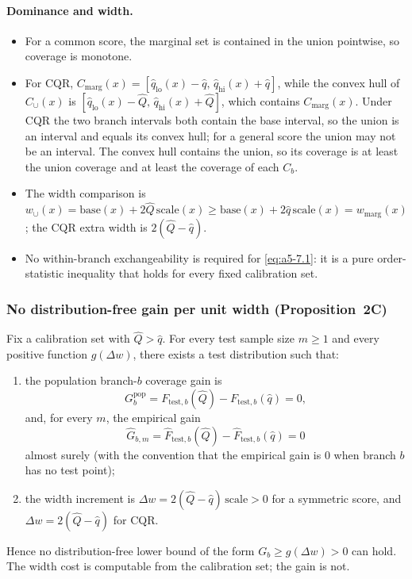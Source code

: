 \paragraph{Dominance and width.}
\begin{itemize}
\item For a common score, the marginal set is contained in the union
pointwise, so coverage is monotone.
\item For CQR,
$C_{\mathrm{marg}}(x)=[\hat q_{\mathrm{lo}}(x)-\hat q,\,
\hat q_{\mathrm{hi}}(x)+\hat q]$, while the convex hull of $C_\cup(x)$
is $[\hat q_{\mathrm{lo}}(x)-\hat Q,\,
\hat q_{\mathrm{hi}}(x)+\hat Q]$, which contains
$C_{\mathrm{marg}}(x)$.  Under CQR the two branch intervals both
contain the base interval, so the union is an interval and equals its
convex hull; for a general score the union may not be an interval.  The
convex hull contains the union, so its coverage is at least the union
coverage and at least the coverage of each $C_b$.
\item The width comparison is
$w_\cup(x)=\mathrm{base}(x)+2\hat Q\,\mathrm{scale}(x)
\ge\mathrm{base}(x)+2\hat q\,\mathrm{scale}(x)=w_{\mathrm{marg}}(x)$;
the CQR extra width is $2(\hat Q-\hat q)$.
\item No within-branch exchangeability is required for
\eqref{eq:a5-7.1}: it is a pure order-statistic inequality that holds
for every fixed calibration set.
\end{itemize}

\subsubsection{No distribution-free gain per unit width (Proposition~2C)}

\begin{aVpropC}
Fix a calibration set with $\hat Q>\hat q$.  For every test sample size
$m\ge1$ and every positive function $g(\Delta w)$, there exists a test
distribution such that:
\begin{enumerate}
\item[(i)] the population branch-$b$ coverage gain is
\[
G_b^{\mathrm{pop}}
=F_{\mathrm{test},b}(\hat Q)-F_{\mathrm{test},b}(\hat q)=0,
\]
and, for every $m$, the empirical gain
\[
\hat G_{b,m}
=\hat F_{\mathrm{test},b}(\hat Q)-\hat F_{\mathrm{test},b}(\hat q)=0
\]
almost surely (with the convention that the empirical gain is $0$ when
branch $b$ has no test point);
\item[(ii)] the width increment is
$\Delta w=2(\hat Q-\hat q)\,\mathrm{scale}>0$ for a symmetric score, and
$\Delta w=2(\hat Q-\hat q)$ for CQR.
\end{enumerate}
Hence no distribution-free lower bound of the form
$G_b\ge g(\Delta w)>0$ can hold.  The width cost is computable from the
calibration set; the gain is not.
\end{aVpropC}

